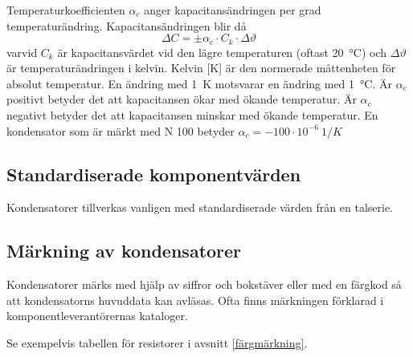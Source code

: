 Temperaturkoefficienten \(\alpha _c\) anger kapacitansändringen per grad temperaturändring.
Kapacitansändringen blir då
\[\Delta C = \pm \alpha _c \cdot C_k \cdot \Delta\vartheta\]
varvid \(C_k\) är kapacitansvärdet vid den lägre temperaturen (oftast
\SI{20}{\degreeCelsius}) och \(\Delta\vartheta\) är temperaturändringen i
kelvin.
Kelvin [K] är den normerade måttenheten för absolut temperatur.
En ändring med \SI{1}{\kelvin} motsvarar en ändring med \SI{1}{\degreeCelsius}.
Är \(\alpha _c\) positivt betyder det att kapacitansen ökar med ökande
temperatur.
Är \(\alpha _c\) negativt betyder det att kapacitansen minskar med ökande
temperatur.
En kondensator som är märkt med N 100 betyder
\(\alpha _c = -100 \cdot 10^{-6}\ 1/K\)

\subsection{Standardiserade komponentvärden}

Kondensatorer tillverkas vanligen med standardiserade värden från en talserie.

\subsection{Märkning av kondensatorer}

Kondensatorer märks med hjälp av siffror och bokstäver eller med en färgkod så
att kondensatorns huvuddata kan avläsas.
Ofta finns märkningen förklarad i komponentleverantörernas kataloger.

Se exempelvis tabellen för resistorer i avsnitt \ref{färgmärkning}.

